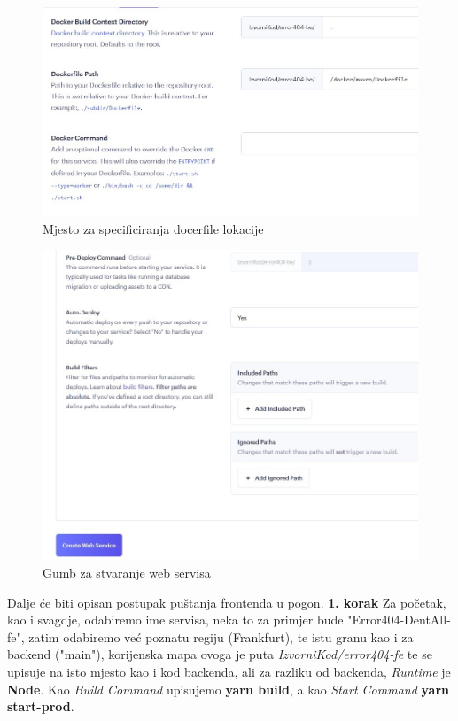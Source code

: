 			\begin{figure}[H]
				\includegraphics[width=\linewidth]{slike/BackendPtFor.JPG}
				\centering
				\caption{Mjesto za specificiranja docerfile lokacije}
				\label{fig:Backend četvrti}
			\end{figure}
			\begin{figure}[H]
				\includegraphics[width=\linewidth]{slike/BackendPtV.JPG}
				\centering
				\caption{Gumb za stvaranje web servisa}
				\label{fig:Backend peti}
			\end{figure}
			Dalje će biti opisan postupak puštanja frontenda u pogon.  %
			\newline 
			\textbf{1. korak} \newline
			Za početak, kao i svagdje, odabiremo ime servisa, neka to za primjer bude "Error404-DentAll-fe", zatim odabiremo već poznatu regiju (Frankfurt), te istu granu kao i za backend ("main"), korijenska mapa ovoga je puta \textit{IzvorniKod/error404-fe} te se upisuje na isto mjesto kao i kod backenda, ali za razliku od backenda, \textit{Runtime} je \textbf{Node}. Kao \textit{Build Command} upisujemo \textbf{yarn build}, a kao \textit{Start Command} \textbf{yarn start-prod}.
